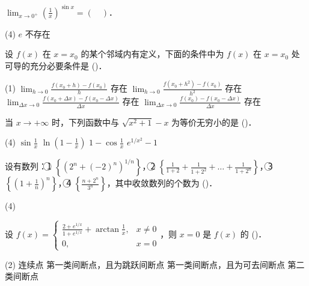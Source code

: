 \documentclass[
  a4paper,
  11pt,
  title in boldface,
  theorem in new line,
  remove problem qed
]{homework}
\begin{document}
\begin{problem}
  $\lim_{x \to 0^+} \left(\frac{1}{x}\right)^{\sin x} = (\quad)$．

  \begin{tasks}(4)
  \task $e$
  \task 不存在
\end{tasks}
\end{problem}

\begin{problem}
  设 $f(x)$ 在 $x=x_0$ 的某个邻域内有定义，下面的条件中为 $f(x)$ 在 $x=x_0$ 处可导的充分必要条件是 (\quad)．

  \begin{tasks}(1)
  \task $\lim_{h \to 0} \frac{f(x_0+h) - f(x_0)}{h}$ 存在
  \task $\lim_{h \to 0} \frac{f(x_0+h^2) - f(x_0)}{h^2}$ 存在
  \task $\lim_{\Delta x \to 0} \frac{f(x_0+\Delta x) - f(x_0-\Delta x)}{\Delta x}$ 存在
  \task $\lim_{\Delta x \to 0} \frac{f(x_0) - f(x_0-\Delta x)}{\Delta x}$ 存在
\end{tasks}
\end{problem}

\begin{problem}
  当 $x \to +\infty$ 时，下列函数中与 $\sqrt{x^2+1}-x$ 为等价无穷小的是 (\quad)．

  \begin{tasks}(4)
  \task $\sin \frac{1}{x}$
  \task $\ln (1-\frac{1}{x})$
  \task $1-\cos \frac{1}{x}$
  \task $e^{1/x^2}-1$
\end{tasks}
\end{problem}

\begin{problem}
  设有数列：\textcircled{\scriptsize 1} $\left\{ (2^n+(-2)^n)^{1/n} \right\}$，\textcircled{\scriptsize 2} $\left\{ \frac{1}{1+2} + \frac{1}{1+2^2} + \dots + \frac{1}{1+2^n} \right\}$，\textcircled{\scriptsize 3} $\left\{ (1+\frac{1}{n})^n \right\}$，\textcircled{\scriptsize 4} $\left\{ \frac{n+2^n}{3^n} \right\}$，其中收敛数列的个数为 (\quad)．

  \begin{tasks}(4)
\end{tasks}
\end{problem}

\begin{problem}
  设 $f(x) = \begin{cases} \frac{2+e^{1/x}}{1+e^{1/x}} + \arctan \frac{1}{x}, & x \ne 0 \\ 0, & x=0 \end{cases}$，则 $x=0$ 是 $f(x)$ 的 (\quad)．

  \begin{tasks}(2)
  \task 连续点
  \task 第一类间断点，且为跳跃间断点
  \task 第一类间断点，且为可去间断点
  \task 第二类间断点
\end{tasks}
\end{problem}
\end{document}
